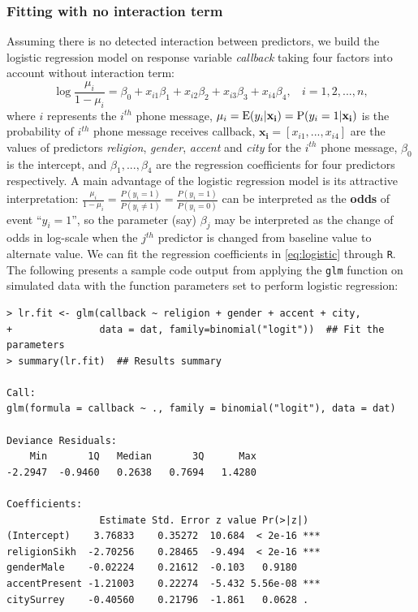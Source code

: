 \documentclass[11pt]{article}
\begin{document}
\subsubsection{Fitting with no interaction term}
Assuming there is no detected interaction between predictors, we build the logistic regression model on response variable \textit{callback} taking four factors into account without interaction term:
\begin{equation}
    \log \frac{\mu_i}{1-\mu_i}  = \beta_0 + x_{i1}\beta_1 + x_{i2}\beta_2 + x_{i3}\beta_3 + x_{i4}\beta_4,\ \ \ \ i=1,2,...,n,
    \label{eq:logistic}
\end{equation}
where $i$ represents the $i^{th}$ phone message,  $\mu_i = \textnormal{E}(y_i|\mathbf{x_i}) = \textnormal{P}(y_i = 1|\mathbf{x_i})$ is the probability of $i^{th}$ phone message receives callback, $\mathbf{x_i} = [x_{i1},...,x_{i4}]$ are the values of predictors \textit{religion}, \textit{gender}, \textit{accent}  and \textit{city} for the $i^{th}$ phone message, $\beta_0$ is the intercept, and $\beta_1, ..., \beta_4$ are the regression coefficients for four predictors respectively. A main advantage of the logistic regression model is its attractive interpretation: $\frac{\mu_i}{1-\mu_i} = \frac{P(y_i=1)}{P(y_i\neq 1)} = \frac{P(y_i=1)}{P(y_i=0)}$ can be interpreted as the \textbf{odds} of event ``$y_i=1$'', so the parameter (say) $\beta_j$ may be interpreted as the change of odds in log-scale when the $j^{th}$ predictor is changed from baseline value to alternate value. We can fit the regression coefficients in \autoref{eq:logistic} through \texttt{R}. The following presents a sample code output from applying the \texttt{glm} function on simulated data with the function parameters set to perform logistic regression:
\begin{verbatim}
> lr.fit <- glm(callback ~ religion + gender + accent + city, 
+               data = dat, family=binomial("logit"))  ## Fit the parameters
> summary(lr.fit)  ## Results summary

Call:
glm(formula = callback ~ ., family = binomial("logit"), data = dat)

Deviance Residuals: 
    Min       1Q   Median       3Q      Max  
-2.2947  -0.9460   0.2638   0.7694   1.4280  

Coefficients:
                Estimate Std. Error z value Pr(>|z|)    
(Intercept)    3.76833    0.35272  10.684  < 2e-16 ***
religionSikh  -2.70256    0.28465  -9.494  < 2e-16 ***
genderMale    -0.02224    0.21612  -0.103   0.9180    
accentPresent -1.21003    0.22274  -5.432 5.56e-08 ***
citySurrey    -0.40560    0.21796  -1.861   0.0628 .  
\end{verbatim}
\end{document}
